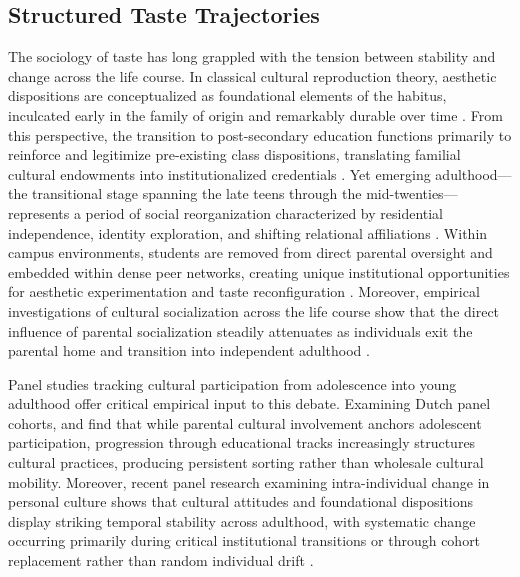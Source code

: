 \documentclass[12pt]{article}
\begin{document}
\subsection{Structured Taste Trajectories}
The sociology of taste has long grappled with the tension between stability and change across the life course. In classical cultural reproduction theory, aesthetic dispositions are conceptualized as foundational elements of the habitus, inculcated early in the family of origin and remarkably durable over time \citep{bourdieu1984distinction,willekens2014family}. From this perspective, the transition to post-secondary education functions primarily to reinforce and legitimize pre-existing class dispositions, translating familial cultural endowments into institutionalized credentials \citep{dimaggio1985cultural-6fe}. Yet emerging adulthood---the transitional stage spanning the late teens through the mid-twenties---represents a period of social reorganization characterized by residential independence, identity exploration, and shifting relational affiliations \citep{weinberger2017consuming,prieur2023distinctions}. Within campus environments, students are removed from direct parental oversight and embedded within dense peer networks, creating unique institutional opportunities for aesthetic experimentation and taste reconfiguration \citep{lewis2018conversion}. Moreover, empirical investigations of cultural socialization across the life course show that the direct influence of parental socialization steadily attenuates as individuals exit the parental home and transition into independent adulthood \citep{meuleman2018parental}.

Panel studies tracking cultural participation from adolescence into young adulthood offer critical empirical input to this debate. Examining Dutch panel cohorts, \citet{nagel2002participation} and \citet{nagel2010cultural} find that while parental cultural involvement anchors adolescent participation, progression through educational tracks increasingly structures cultural practices, producing persistent sorting rather than wholesale cultural mobility. Moreover, recent panel research examining intra-individual change in personal culture shows that cultural attitudes and foundational dispositions display striking temporal stability across adulthood, with systematic change occurring primarily during critical institutional transitions or through cohort replacement rather than random individual drift \citep{vaisey2016cultural-867,kiley2020measuring-123,vaisey2021model-based-deb}.
\end{document}
